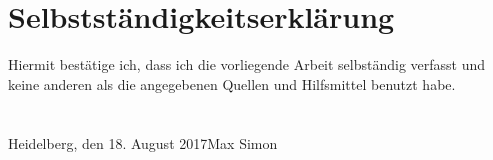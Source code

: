 \chapter*{Selbstständigkeitserklärung}
Hiermit bestätige ich, dass ich die vorliegende Arbeit selbständig verfasst und keine anderen als die angegebenen Quellen und Hilfsmittel benutzt habe.\\
\\
\\
Heidelberg, den 18. August 2017\hspace{3.5cm}Max Simon
